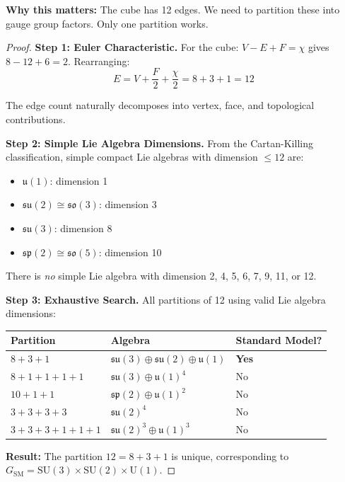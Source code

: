 \documentclass[11pt,a4paper]{article}
\theoremstyle{plain}
\theoremstyle{definition}
\theoremstyle{remark}
\newcommand{\SUthree}{\text{SU}(3)}
\newcommand{\SUtwo}{\text{SU}(2)}
\newcommand{\Uone}{\text{U}(1)}
\newcommand{\GSM}{G_{\text{SM}}}
\begin{document}
\textbf{Why this matters:} The cube has 12 edges. We need to partition these into gauge group factors. Only one partition works.

\begin{proof}
\textbf{Step 1: Euler Characteristic.} For the cube: $V - E + F = \chi$ gives $8 - 12 + 6 = 2$. Rearranging:
\[
E = V + \frac{F}{2} + \frac{\chi}{2} = 8 + 3 + 1 = 12
\]

The edge count naturally decomposes into vertex, face, and topological contributions.

\textbf{Step 2: Simple Lie Algebra Dimensions.} From the Cartan-Killing classification, simple compact Lie algebras with dimension $\leq 12$ are:
\begin{itemize}
  \item $\mathfrak{u}(1)$: dimension 1
  \item $\mathfrak{su}(2) \cong \mathfrak{so}(3)$: dimension 3
  \item $\mathfrak{su}(3)$: dimension 8
  \item $\mathfrak{sp}(2) \cong \mathfrak{so}(5)$: dimension 10
\end{itemize}

There is \emph{no} simple Lie algebra with dimension 2, 4, 5, 6, 7, 9, 11, or 12.

\textbf{Step 3: Exhaustive Search.} All partitions of 12 using valid Lie algebra dimensions:

\begin{center}
\begin{tabular}{lll}
\toprule
\textbf{Partition} & \textbf{Algebra} & \textbf{Standard Model?} \\
\midrule
$8 + 3 + 1$ & $\mathfrak{su}(3) \oplus \mathfrak{su}(2) \oplus \mathfrak{u}(1)$ & \textbf{Yes} \\
$8 + 1 + 1 + 1 + 1$ & $\mathfrak{su}(3) \oplus \mathfrak{u}(1)^4$ & No \\
$10 + 1 + 1$ & $\mathfrak{sp}(2) \oplus \mathfrak{u}(1)^2$ & No \\
$3 + 3 + 3 + 3$ & $\mathfrak{su}(2)^4$ & No \\
$3 + 3 + 3 + 1 + 1 + 1$ & $\mathfrak{su}(2)^3 \oplus \mathfrak{u}(1)^3$ & No \\
\bottomrule
\end{tabular}
\end{center}

\textbf{Result:} The partition $12 = 8 + 3 + 1$ is unique, corresponding to $\GSM = \SUthree \times \SUtwo \times \Uone$.
\end{proof}
\end{document}
